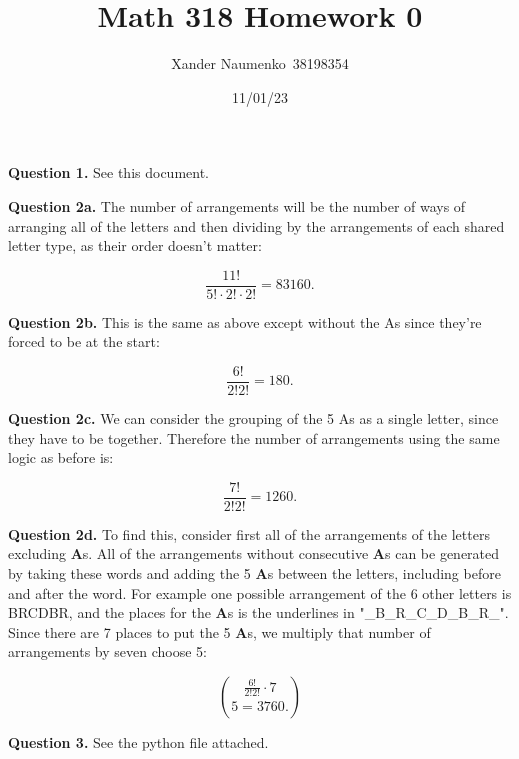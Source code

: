 \documentclass[letterpaper, reqno,11pt]{article}
\begin{document}
\title{Math 318 Homework 0}
\date{11/01/23}
\author{Xander Naumenko\ 38198354}
\maketitle

{\noindent\bf Question 1.} See this document.  

{\noindent\bf Question 2a.} The number of arrangements will be the number of ways of arranging all of the letters and then dividing by the arrangements of each shared letter type, as their order doesn't matter: 

\[
    \frac{11!}{5!\cdot 2!\cdot 2!} = 83160
.\]

{\noindent\bf Question 2b.} This is the same as above except without the As since they're forced to be at the start: 

\[
    \frac{6!}{2!2!}=180
.\]

{\noindent\bf Question 2c.} We can consider the grouping of the 5 As as a single letter, since they have to be together. Therefore the number of arrangements using the same logic as before is: 

\[
    \frac{7!}{2!2!}=1260
.\]

{\noindent\bf Question 2d.} To find this, consider first all of the arrangements of the letters excluding {\bf A}s. All of the arrangements without consecutive {\bf A}s can be generated by taking these words and adding the 5 {\bf A}s between the letters, including before and after the word. For example one possible arrangement of the 6 other letters is BRCDBR, and the places for the {\bf A}s is the underlines in "\_B\_R\_C\_D\_B\_R\_". Since there are 7 places to put the 5 {\bf A}s, we multiply that number of arrangements by seven choose 5: 

\[
    \frac{6!}{2!2!}\cdot 7\choose 5 = 3760
.\]

{\noindent\bf Question 3.} See the python file attached. 
\end{document}

